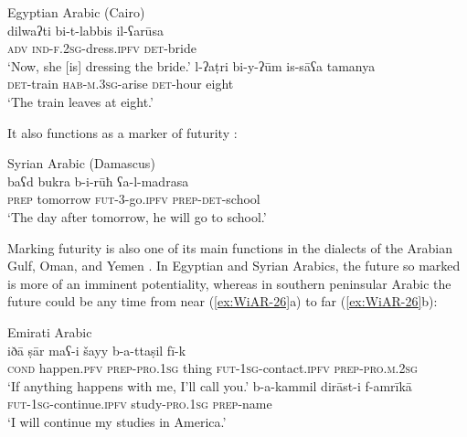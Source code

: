 \documentclass[output=paper,colorlinks,citecolor=brown]{langscibook}
\begin{document}
\ea Egyptian Arabic (Cairo)\label{ex:WiAR-24}\\
  \ea
  	\gll dilwaʔti bi-t-labbis il-ʕarūsa\\
  	\textsc{adv} \textsc{ind-f.2sg}-dress.\textsc{ipfv}	\textsc{det}-bride\\
  	\glt ‘Now, she [is] dressing the bride.’ \citep[281]{woidich2006a}
  \ex
  	\gll l-ʔaṭri bi-y-ʔūm is-sāʕa tamanya\\
  	\textsc{det}-train \textsc{hab-m.3sg}-arise \textsc{det}-hour eight\\
  	\glt ‘The train leaves at eight.’ \citep[281]{woidich2006a}
\z \z

It also functions as a marker of futurity \citep[326]{cowell2005a}:

\ea Syrian Arabic (Damascus)\label{ex:WiAR-25}\\
	\gll baʕd bukra b-i-rūħ ʕa-l-madrasa\\
	\textsc{prep} tomorrow \textsc{fut}-3-go.\textsc{ipfv} \textsc{prep-det}-school\\
	\glt ‘The day after tomorrow, he will go to school.’ \citep[324]{cowell2005a}
\z

Marking futurity is also one of its main functions in the dialects of the Arabian Gulf, Oman, and Yemen \citep{persson2008a, retsoe2011a, retsoe2014a}. In Egyptian and Syrian Arabics, the future so marked is more of an imminent potentiality, whereas in southern peninsular Arabic the future could be any time from near (\ref{ex:WiAR-26}a) to far (\ref{ex:WiAR-26}b):

\ea Emirati Arabic\label{ex:WiAR-26}\\
  \ea
  	\gll iðā ṣār maʕ-i šayy b-a-ttaṣil fī-k\\
  	\textsc{cond} happen.\textsc{pfv} \textsc{prep-pro.1sg} thing \textsc{fut-1sg}-contact.\textsc{ipfv} \textsc{prep-pro.m.2sg}\\
  	\glt ‘If anything happens with me, I’ll call you.’ \citep[750]{jarad2017a}
  \ex
  	\gll b-a-kammil dirāst-i f-amrīkā\\
  	\textsc{fut-1sg}-continue.\textsc{ipfv} study-\textsc{pro.1sg} \textsc{prep}-name\\
  	\glt ‘I will continue my studies in America.’ \citep[751]{jarad2017a}
\z \z
\end{document}
